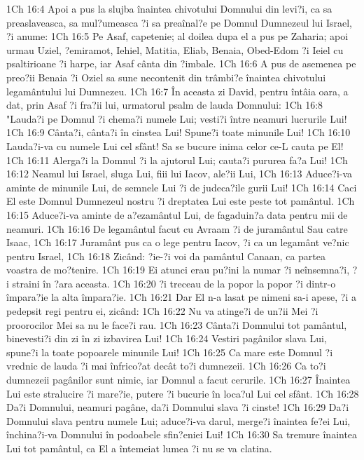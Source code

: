 1Ch 16:4  Apoi a pus la slujba înaintea chivotului Domnului din levi?i, ca sa preaslaveasca, sa mul?umeasca ?i sa preaînal?e pe Domnul Dumnezeul lui Israel, ?i anume:
1Ch 16:5  Pe Asaf, capetenie; al doilea dupa el a pus pe Zaharia; apoi urmau Uziel, ?emiramot, Iehiel, Matitia, Eliab, Benaia, Obed-Edom ?i Ieiel cu psaltirioane ?i harpe, iar Asaf cânta din ?imbale.
1Ch 16:6  A pus de asemenea pe preo?ii Benaia ?i Oziel sa sune necontenit din trâmbi?e înaintea chivotului legamântului lui Dumnezeu.
1Ch 16:7  În aceasta zi David, pentru întâia oara, a dat, prin Asaf ?i fra?ii lui, urmatorul psalm de lauda Domnului:
1Ch 16:8  "Lauda?i pe Domnul ?i chema?i numele Lui; vesti?i între neamuri lucrurile Lui!
1Ch 16:9  Cânta?i, cânta?i în cinstea Lui! Spune?i toate minunile Lui!
1Ch 16:10  Lauda?i-va cu numele Lui cel sfânt! Sa se bucure inima celor ce-L cauta pe El!
1Ch 16:11  Alerga?i la Domnul ?i la ajutorul Lui; cauta?i pururea fa?a Lui!
1Ch 16:12  Neamul lui Israel, sluga Lui, fiii lui Iacov, ale?ii Lui,
1Ch 16:13  Aduce?i-va aminte de minunile Lui, de semnele Lui ?i de judeca?ile gurii Lui!
1Ch 16:14  Caci El este Domnul Dumnezeul nostru ?i dreptatea Lui este peste tot pamântul.
1Ch 16:15  Aduce?i-va aminte de a?ezamântul Lui, de fagaduin?a data pentru mii de neamuri.
1Ch 16:16  De legamântul facut cu Avraam ?i de juramântul Sau catre Isaac,
1Ch 16:17  Juramânt pus ca o lege pentru Iacov, ?i ca un legamânt ve?nic pentru Israel,
1Ch 16:18  Zicând: ?ie-?i voi da pamântul Canaan, ca partea voastra de mo?tenire.
1Ch 16:19  Ei atunci erau pu?ini la numar ?i neînsemna?i, ?i straini în ?ara aceasta.
1Ch 16:20  ?i treceau de la popor la popor ?i dintr-o împara?ie la alta împara?ie.
1Ch 16:21  Dar El n-a lasat pe nimeni sa-i apese, ?i a pedepsit regi pentru ei, zicând:
1Ch 16:22  Nu va atinge?i de un?ii Mei ?i proorocilor Mei sa nu le face?i rau.
1Ch 16:23  Cânta?i Domnului tot pamântul, binevesti?i din zi în zi izbavirea Lui!
1Ch 16:24  Vestiri pagânilor slava Lui, spune?i la toate popoarele minunile Lui!
1Ch 16:25  Ca mare este Domnul ?i vrednic de lauda ?i mai înfrico?at decât to?i dumnezeii.
1Ch 16:26  Ca to?i dumnezeii pagânilor sunt nimic, iar Domnul a facut cerurile.
1Ch 16:27  Înaintea Lui este stralucire ?i mare?ie, putere ?i bucurie în loca?ul Lui cel sfânt.
1Ch 16:28  Da?i Domnului, neamuri pagâne, da?i Domnului slava ?i cinste!
1Ch 16:29  Da?i Domnului slava pentru numele Lui; aduce?i-va darul, merge?i înaintea fe?ei Lui, închina?i-va Domnului în podoabele sfin?eniei Lui!
1Ch 16:30  Sa tremure înaintea Lui tot pamântul, ca El a întemeiat lumea ?i nu se va clatina.
